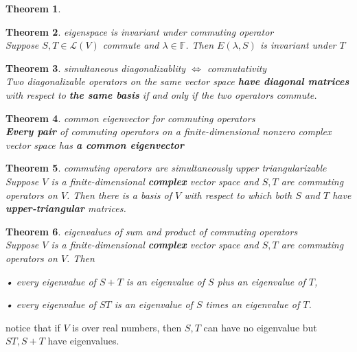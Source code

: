 \documentclass{article}
\newtheorem{theorem}{Theorem}[subsection]
\newcommand{\FF}{\mathbb{F}}
\begin{document}
\begin{CJK}{UTF8}{gkai}
\begin{theorem}
\end{theorem}

\begin{theorem}
    eigenspace is invariant under commuting operator\\
    
    Suppose $S,T \in \mathcal{L}(V)$ commute and $\lambda \in \FF$. Then $E (\lambda,S)$ is invariant under $T$
\end{theorem}

\begin{theorem}
    simultaneous diagonalizablity $\Leftrightarrow$ commutativity\\

    Two diagonalizable operators on the same vector space \textbf{have diagonal matrices} with respect to \textbf{the same basis} if and only if the two operators commute.
\end{theorem}

\begin{theorem}
    common eigenvector for commuting operators\\

    \textbf{Every pair} of commuting operators on a finite-dimensional nonzero complex
    vector space has \textbf{a common eigenvector}
\end{theorem}

\begin{theorem}
    commuting operators are simultaneously upper triangularizable\\

    Suppose $V$ is a finite-dimensional \textbf{complex} vector space and $S,T$ are commuting operators on $V$. Then there is a basis of $V$ with respect to which both $S$ and $T$ have \textbf{upper-triangular} matrices.
\end{theorem}

\begin{theorem}
    eigenvalues of sum and product of commuting operators\\

    Suppose $V$ is a finite-dimensional \textbf{complex} vector space and $S,T$ are commuting operators on $V$. Then

    • every eigenvalue of $S + T$ is an eigenvalue of $S$ plus an eigenvalue of $T$,

    • every eigenvalue of $ST$ is an eigenvalue of $S$ times an eigenvalue of $T$.
\end{theorem}

notice that if $V$ is over real numbers, then $S,T$ can have no eigenvalue but $ST,S + T $ have eigenvalues.


\end{CJK}
\end{document}
